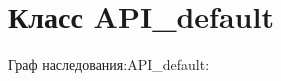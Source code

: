 \hypertarget{classAPI__default}{}\section{Класс A\+P\+I\+\_\+default}
\label{classAPI__default}


Граф наследования\+:A\+P\+I\+\_\+default\+:
